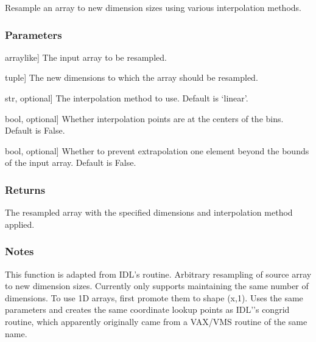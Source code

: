 \documentclass[letterpaper,10pt,english]{sphinxmanual}
\begin{document}
\begin{fulllineitems}
\label{\detokenize{pycatch/utils/extensions:pycatch.utils.extensions.congrid}}
\pysigstartsignatures
{}
\pysigstopsignatures
\sphinxAtStartPar
Resample an array to new dimension sizes using various interpolation methods.


\subsubsection{Parameters}
\label{\detokenize{pycatch/utils/extensions:parameters}}\begin{description}
\sphinxlineitem{a}{[}array\sphinxhyphen{}like{]}
\sphinxAtStartPar
The input array to be resampled.

\sphinxlineitem{newdims}{[}tuple{]}
\sphinxAtStartPar
The new dimensions to which the array should be resampled.

\sphinxlineitem{method}{[}str, optional{]}
\sphinxAtStartPar
The interpolation method to use. Default is ‘linear’.

\sphinxlineitem{centre}{[}bool, optional{]}
\sphinxAtStartPar
Whether interpolation points are at the centers of the bins. Default is False.

\sphinxlineitem{minusone}{[}bool, optional{]}
\sphinxAtStartPar
Whether to prevent extrapolation one element beyond the bounds of the input array. Default is False.

\end{description}


\subsubsection{Returns}
\label{\detokenize{pycatch/utils/extensions:returns}}\begin{description}
\sphinxAtStartPar
The resampled array with the specified dimensions and interpolation method applied.

\end{description}


\subsubsection{Notes}
\label{\detokenize{pycatch/utils/extensions:notes}}
\sphinxAtStartPar
This function is adapted from IDL’s  routine.
Arbitrary resampling of source array to new dimension sizes. Currently only supports maintaining the same number of dimensions. To use 1\sphinxhyphen{}D arrays, first promote them to shape (x,1).
Uses the same parameters and creates the same co\sphinxhyphen{}ordinate lookup points as IDL’’s congrid routine, which apparently originally came from a VAX/VMS routine of the same name.


\end{fulllineitems}
\end{document}
